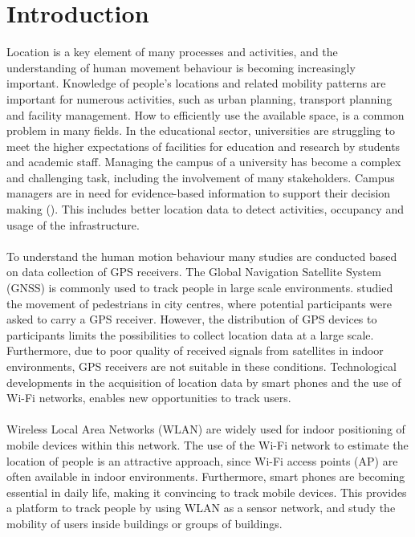 \section{Introduction}\label{1-introduction}
Location is a key element of many processes and activities, and the understanding of human movement behaviour is becoming increasingly important. Knowledge of people’s locations and related mobility patterns are important for numerous activities, such as urban planning, transport planning and facility management. How to efficiently use the available space, is a common problem in many fields. In the educational sector, universities are struggling to meet the higher expectations of facilities for education and research by students and academic staff. Managing the campus of a university has become a complex and challenging task, including the involvement of many stakeholders. Campus managers are in need for evidence-based information to support their decision making (\cite{heijer2012campus}). This includes better location data to detect activities, occupancy and usage of the infrastructure.
\\\\
To understand the human motion behaviour many studies are conducted based on data collection of GPS receivers. The Global Navigation Satellite System (GNSS) is commonly used to track people in large scale environments. \cite{spek2008tracking} studied the movement of pedestrians in city centres, where potential participants were asked to carry a GPS receiver. However, the distribution of GPS devices to participants limits the possibilities to collect location data at a large scale. Furthermore, due to poor quality of received signals from satellites in indoor environments, GPS receivers are not suitable in these conditions. Technological developments in the acquisition of location data by smart phones and the use of Wi-Fi networks, enables new opportunities to track users. 
\\\\
Wireless Local Area Networks (WLAN) are widely used for indoor positioning of mobile devices within this network. The use of the Wi-Fi network to estimate the location of people is an attractive approach, since Wi-Fi access points (AP) are often available in indoor environments. Furthermore, smart phones are becoming essential in daily life, making it convincing to track mobile devices. This provides a platform to track people by using WLAN as a sensor network, and study the mobility of users inside buildings or groups of buildings. 

